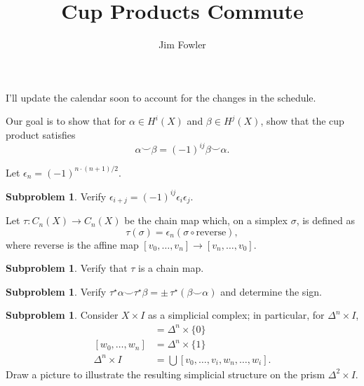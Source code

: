 \documentclass[12pt]{handout}
\title{Cup Products Commute}
\author{Jim Fowler}
\theoremstyle{definition}
\newtheorem{subproblem}[theorem]{Subproblem}
\begin{document}
\maketitle

I'll update the calendar soon to account for the changes in the schedule.

\begin{remark}
  Our goal is to show that for $\alpha \in H^i(X)$ and $\beta \in H^j(X)$, show that the cup product satisfies
  \[
  \alpha \smallsmile \beta = (-1)^{ij} \beta \smallsmile \alpha.
  \]
\end{remark}

\begin{definition}
Let $\epsilon_n = (-1)^{n \cdot (n+1)/2}$.
\end{definition}

\begin{subproblem}
Verify $\epsilon_{i+j} = (-1)^{ij} \epsilon_i \epsilon_j$.
\end{subproblem}

\begin{definition}
Let $\tau : C_n(X) \to C_n(X)$ be the chain map which, on a simplex $\sigma$, is defined as
\[
\tau(\sigma) = \epsilon_n (\sigma \circ \mathrm{reverse}),
\]
where $\mathrm{reverse}$ is the affine map $[v_0,\ldots,v_n] \to
[v_n,\ldots,v_0]$.
\end{definition}

\begin{subproblem}
Verify that $\tau$ is a chain map.
\end{subproblem}

\begin{subproblem}
  Verify $\tau^\star \alpha \smallsmile \tau^\star \beta = \pm
  \,\tau^\star(\beta \smallsmile \alpha)$ and determine the sign.
\end{subproblem}

\begin{subproblem}
  Consider $X \times I$ as a simplicial complex; in particular, for
  $\Delta^n \times I$,
  \begin{align*}
    [v_0,\ldots,v_n] &= \Delta^n \times \{0\} \\
    [w_0,\ldots,w_n] &= \Delta^n \times \{1\} \\
    \Delta^n \times I &= \bigcup [v_0,\ldots,v_i,w_n,\ldots,w_i].
    \end{align*}
    Draw a picture to illustrate the resulting simplicial structure on the prism $\Delta^2 \times I$.
\end{subproblem}
\end{document}

